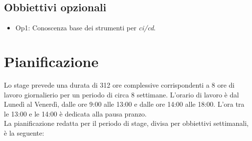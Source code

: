 \subsection{Obbiettivi opzionali}
\begin{itemize}
    \item Op1: Conoscenza base dei strumenti per \textit{\gls{ci}\glsfirstoccur{}/\gls{cd}\glsfirstoccur{}}.
\end{itemize}

\section{Pianificazione}
Lo stage prevede una durata di 312 ore complessive corrispondenti a 8 ore di lavoro giornalierio per un periodo di circa 8 settimane. L'orario di lavoro è dal Lunedì al Venerdì, dalle ore 9:00 alle 13:00 e dalle ore 14:00 alle 18:00. L'ora tra le 13:00 e le 14:00 è dedicata alla pausa pranzo.
\\La pianificazione redatta per il periodo di stage, divisa per obbiettivi settimanali, è la seguente:
